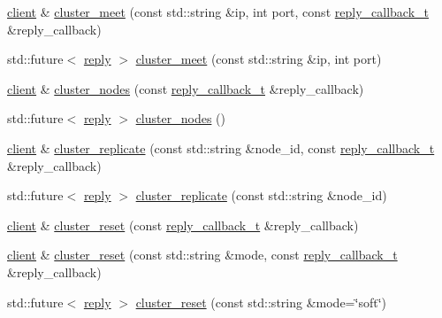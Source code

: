 \begin{DoxyCompactItemize}
\hyperlink{classcpp__redis_1_1client}{client} \& \hyperlink{classcpp__redis_1_1client_aefc94be1dc7eb11673ba92bc8cbffdcf}{cluster\+\_\+meet} (const std\+::string \&ip, int port, const \hyperlink{classcpp__redis_1_1client_a061a1140d36d2eaeda82b09a0bb3f9f2}{reply\+\_\+callback\+\_\+t} \&reply\+\_\+callback)
\item 
std\+::future$<$ \hyperlink{classcpp__redis_1_1reply}{reply} $>$ \hyperlink{classcpp__redis_1_1client_af142b166d5f88f76f5fd46e6e33c0523}{cluster\+\_\+meet} (const std\+::string \&ip, int port)
\item 
\hyperlink{classcpp__redis_1_1client}{client} \& \hyperlink{classcpp__redis_1_1client_a1e4cc880ce249fcad1b1f6ddd15f515f}{cluster\+\_\+nodes} (const \hyperlink{classcpp__redis_1_1client_a061a1140d36d2eaeda82b09a0bb3f9f2}{reply\+\_\+callback\+\_\+t} \&reply\+\_\+callback)
\item 
std\+::future$<$ \hyperlink{classcpp__redis_1_1reply}{reply} $>$ \hyperlink{classcpp__redis_1_1client_a6e777dc7b54ecb4aff3e1c281f92dd81}{cluster\+\_\+nodes} ()
\item 
\hyperlink{classcpp__redis_1_1client}{client} \& \hyperlink{classcpp__redis_1_1client_a65688223390e47c0400ba4a128000f89}{cluster\+\_\+replicate} (const std\+::string \&node\+\_\+id, const \hyperlink{classcpp__redis_1_1client_a061a1140d36d2eaeda82b09a0bb3f9f2}{reply\+\_\+callback\+\_\+t} \&reply\+\_\+callback)
\item 
std\+::future$<$ \hyperlink{classcpp__redis_1_1reply}{reply} $>$ \hyperlink{classcpp__redis_1_1client_a4ce5b739522aefd5ca7c8aef8c76cc61}{cluster\+\_\+replicate} (const std\+::string \&node\+\_\+id)
\item 
\hyperlink{classcpp__redis_1_1client}{client} \& \hyperlink{classcpp__redis_1_1client_a99c86f1931c92594f2c14ac34b3d5dfd}{cluster\+\_\+reset} (const \hyperlink{classcpp__redis_1_1client_a061a1140d36d2eaeda82b09a0bb3f9f2}{reply\+\_\+callback\+\_\+t} \&reply\+\_\+callback)
\item 
\hyperlink{classcpp__redis_1_1client}{client} \& \hyperlink{classcpp__redis_1_1client_a3f039634232d14d4eec6fea27784a347}{cluster\+\_\+reset} (const std\+::string \&mode, const \hyperlink{classcpp__redis_1_1client_a061a1140d36d2eaeda82b09a0bb3f9f2}{reply\+\_\+callback\+\_\+t} \&reply\+\_\+callback)
\item 
std\+::future$<$ \hyperlink{classcpp__redis_1_1reply}{reply} $>$ \hyperlink{classcpp__redis_1_1client_ac49706b4ea17538653a6e5a77791ae31}{cluster\+\_\+reset} (const std\+::string \&mode=\char`\"{}soft\char`\"{})
\item 

\end{DoxyCompactItemize}
